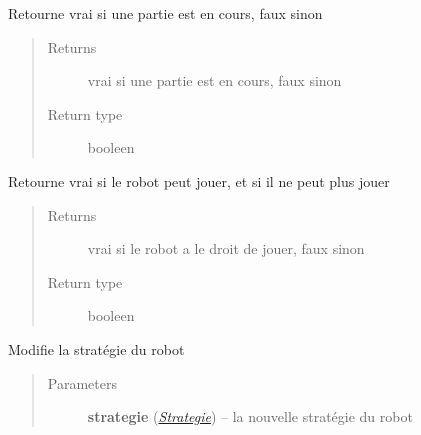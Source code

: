 \documentclass[letterpaper,10pt,english]{sphinxmanual}
\begin{document}
\begin{fulllineitems}
\begin{fulllineitems}
\begin{quote}
\begin{description}
\end{description}\end{quote}

\end{fulllineitems}


\begin{fulllineitems}
\label{index:Robot.Robot.partieEnCours}
Retourne vrai si une partie est en cours, faux sinon
\begin{quote}\begin{description}
\item[{Returns}] \leavevmode
vrai si une partie est en cours, faux sinon

\item[{Return type}] \leavevmode
booleen

\end{description}\end{quote}

\end{fulllineitems}


\begin{fulllineitems}
\label{index:Robot.Robot.peutJouer}
Retourne vrai si le robot peut jouer, et si il ne peut plus jouer
\begin{quote}\begin{description}
\item[{Returns}] \leavevmode
vrai si le robot a le droit de jouer, faux sinon

\item[{Return type}] \leavevmode
booleen

\end{description}\end{quote}

\end{fulllineitems}


\begin{fulllineitems}
\label{index:Robot.Robot.setStrategie}
Modifie la stratégie du robot
\begin{quote}\begin{description}
\item[{Parameters}] \leavevmode
\textbf{strategie} ({\hyperref[index:module-Strategie]{\emph{Strategie}}}) -- la nouvelle stratégie du robot


\end{description}
\end{quote}
\end{fulllineitems}
\end{fulllineitems}
\end{document}
